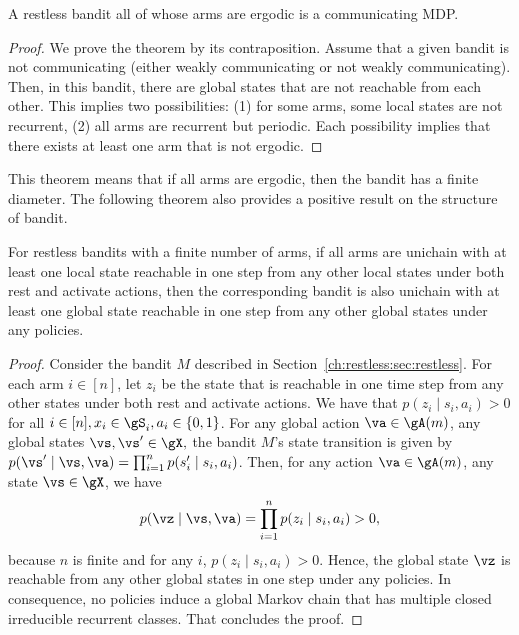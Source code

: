 \begin{thm}
    \label{thm:aperiodic_RB_comm} A restless bandit all of whose arms are ergodic is a communicating MDP.
\end{thm}
\begin{proof}
    We prove the theorem by its contraposition. Assume that a given bandit is not communicating (either weakly communicating or not weakly communicating).
    Then, in this bandit, there are global states that are not reachable from each other.
    This implies two possibilities: (1) for some arms, some local states are not recurrent, (2) all arms are recurrent but periodic.
    Each possibility implies that there exists at least one arm that is not ergodic.
\end{proof}
This theorem means that if all arms are ergodic, then the bandit has a finite diameter.
The following theorem also provides a positive result on the structure of bandit.

\begin{thm}
    \label{thm:unichain}
    For restless bandits with a finite number of arms, if all arms are unichain with at least one local state reachable in one step from any other local states under both rest and activate actions, then the corresponding bandit is also unichain with at least one global state reachable in one step from any other global states under any policies.
\end{thm}
\begin{proof}
    Consider the bandit $M$ described in Section~\ref{ch:restless:sec:restless}.
    For each arm $i\in[n]$, let $z_i$ be the state that is reachable in one time step from any other states under both rest and activate actions.
    We have that $p(z_i \mid s_i, a_i)>0$ for all $i\in[n], x_i\in\gS_i,a_i\in\{0,1\}$.
    For any global action $\va\in\gA(m)$, any global states $\vs,\vs'\in\gX,$ the bandit $M$'s state transition is given by ${p(\vs' \mid \vs, \va) =\prod_{i=1}^n p(s'_i \mid s_i, a_i)}$.
    Then, for any action $\va\in\gA(m)$, any state $\vs\in\gX$, we have
    \begin{align*}
        p(\vz \mid \vs, \va) =\prod_{i=1}^n p(z_i \mid s_i,a_i) > 0,
    \end{align*}
    because $n$ is finite and for any $i$, $p(z_i \mid s_i, a_i)>0$.
    Hence, the global state $\vz$ is reachable from any other global states in one step under any policies.
    In consequence, no policies induce a global Markov chain that has multiple closed irreducible recurrent classes.
    That concludes the proof.
\end{proof}


